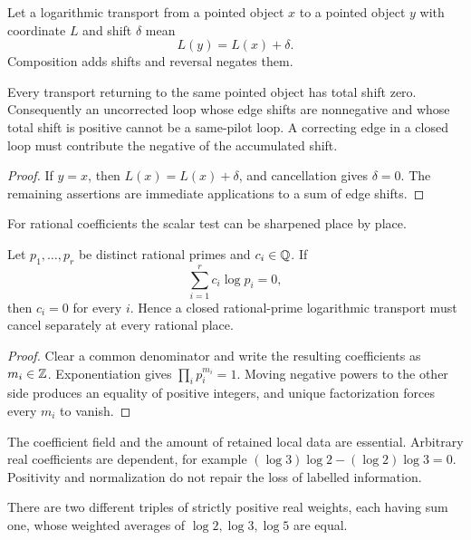 Let a logarithmic transport from a pointed object $x$ to a pointed object
$y$ with coordinate $L$ and shift $\delta$ mean
\[
                              L(y)=L(x)+\delta.
\]
Composition adds shifts and reversal negates them.

\begin{theorem}
\label{thm:hdd-zero-holonomy}
Every transport returning to the same pointed object has total shift zero.
Consequently an uncorrected loop whose edge shifts are nonnegative and whose
total shift is positive cannot be a same-pilot loop.  A correcting edge in a
closed loop must contribute the negative of the accumulated shift.
\end{theorem}

\begin{proof}
If $y=x$, then $L(x)=L(x)+\delta$, and cancellation gives $\delta=0$.
The remaining assertions are immediate applications to a sum of edge
shifts.
\end{proof}

For rational coefficients the scalar test can be sharpened place by place.

\begin{theorem}
\label{thm:hdd-prime-ledger}
Let $p_1,\ldots,p_r$ be distinct rational primes and $c_i\in\mathbb Q$.  If
\[
                         \sum_{i=1}^r c_i\log p_i=0,
\]
then $c_i=0$ for every $i$.  Hence a closed rational-prime logarithmic
transport must cancel separately at every rational place.
\end{theorem}

\begin{proof}
Clear a common denominator and write the resulting coefficients as
$m_i\in\mathbb Z$.  Exponentiation gives $\prod_i p_i^{m_i}=1$.  Moving negative
powers to the other side produces an equality of positive integers, and
unique factorization forces every $m_i$ to vanish.
\end{proof}

The coefficient field and the amount of retained local data are essential.
Arbitrary real coefficients are dependent, for example
$(\log3)\log2-(\log2)\log3=0$.  Positivity and normalization do not repair
the loss of labelled information.

\begin{proposition}
\label{prop:hdd-positive-collision}
There are two different triples of strictly positive real weights, each
having sum one, whose weighted averages of $\log2,\log3,\log5$ are equal.
\end{proposition}

